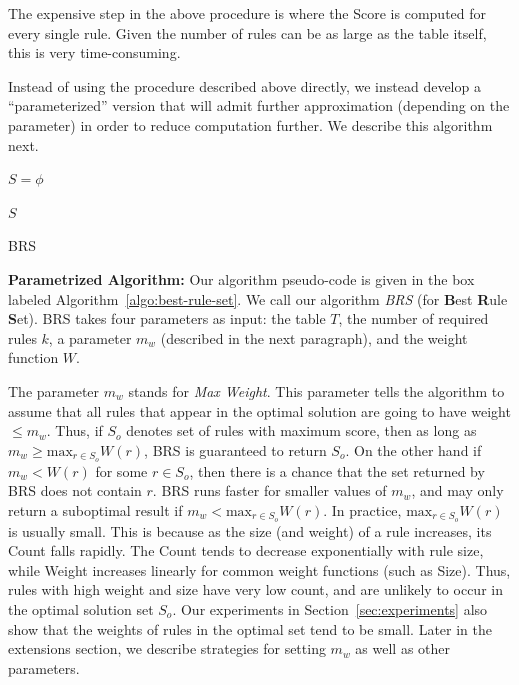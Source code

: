 \documentclass[10pt,journal,compsoc]{IEEEtran}
\newcommand{\stitle}[1]{\vspace{0.5em}\noindent\textbf{#1}}
\newcommand{\eat}[1]{}
\newcommand{\papertext}[1]{#1}
\begin{document}
The expensive step in the above procedure is where the Score is computed for every
single rule. Given the number of rules can be as large as the table itself, this is very time-consuming.

Instead of using the procedure described above directly, we instead develop a ``parameterized'' version 
that will admit further approximation (depending on the parameter) in order to reduce computation further. We describe
this algorithm next.

\begin{algorithm}
\scriptsize
{}
$S = \phi$ 

\Return $S$
\caption{BRS\label{algo:best-rule-set}}
\end{algorithm}

\stitle{Parametrized Algorithm:} Our algorithm pseudo-code is given in the box labeled Algorithm~\ref{algo:best-rule-set}. We call our algorithm {\em BRS} (for \textbf{B}est \textbf{R}ule \textbf{S}et). BRS takes four parameters as input: the table $T$, the number of required rules $k$, a parameter $m_w$ (described in the next paragraph), and the weight function $W$. 

The parameter $m_w$ stands for \textit{Max Weight}. This parameter tells the algorithm to assume that all rules that appear in the optimal solution are going to have weight $\leq m_w$. Thus, if $S_o$ denotes set of rules with maximum score, then as long as $m_w \geq \textrm{max}_{r \in S_o}W(r)$, BRS is guaranteed to return $S_o$. On the other hand if $m_w < W(r)$ for some $r \in S_o$, then there is a chance that the set returned by BRS does not contain $r$. BRS runs faster for smaller values of $m_w$, and may only return a suboptimal result if $m_w < \textrm{max}_{r \in S_o}W(r)$. In practice, $\textrm{max}_{r \in S_o}W(r)$ is usually small. This is because as the size (and weight) of a rule increases, its Count falls rapidly. The Count tends to decrease exponentially with rule size, while Weight increases linearly for common weight functions (such as Size). Thus, rules with high weight and size have very low count, and are unlikely to occur in the optimal solution set $S_o$. Our experiments in Section~\ref{sec:experiments} also show that the weights of rules in the optimal set tend to be small. \eat{In the Extensions Section of the technical report~\cite{DBLP:journals/pvldb/JoglekarGP15}, we describe strategies for setting $k$, $m_w$ and other parameters.} \papertext{Later in the extensions section, we describe strategies for setting $m_w$ as well as other parameters.}
\end{document}
